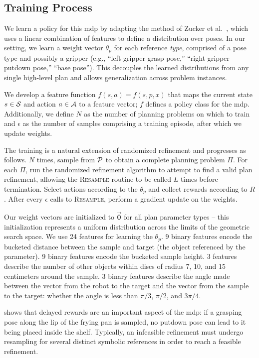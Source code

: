 \subsection{Training Process}
We learn a policy for this {\sc mdp} by adapting the method of Zucker et al.~\cite{workspacebias}, which
uses a linear combination of features to define a distribution over poses. In our setting, we learn a weight
vector $\theta_{p}$ for each reference \emph{type}, comprised of a pose type and possibly a gripper
(e.g., ``left gripper grasp pose,'' ``right gripper putdown pose,'' ``base pose'').
This decouples the learned distributions from any single high-level plan and allows generalization across problem instances.

We develop a feature function $f(s, a) = f(s, p, x)$ that maps the current
state $s \in \mathcal{S}$ and action $a \in \mathcal{A}$ to a
feature vector; $f$ defines a policy class for the {\sc mdp}. Additionally, we define
$N$ as the number of planning problems on which to train and
$\epsilon$ as the number of samples comprising a training episode, after which we update weights.

The training is a natural extension of randomized
refinement and progresses as follows. $N$ times, sample from $\mathcal{P}$ to obtain
a complete planning problem $\Pi$. For each $\Pi$, run the randomized refinement
algorithm to attempt to find a valid plan refinement, allowing the \textsc{Resample}
routine to be called $L$ times before termination. Select actions according to the $\theta_{p}$
and collect rewards according to $R$. After every $\epsilon$ calls to
\textsc{Resample}, perform a gradient update on the weights.

Our weight vectors are initialized to $\vec{\mathbf{0}}$ for all plan parameter types -- this
initialization represents a uniform distribution across the limits of the geometric search space.
We use 24 features for learning the $\theta_{p}$. 9 binary features encode the bucketed distance between the sample
and target (the object referenced by the parameter). 9 binary features encode the bucketed sample height. 3 features
describe the number of other objects within discs of radius 7, 10, and 15 centimeters around the
sample. 3 binary features describe the angle made between the vector from the
robot to the target and the vector from the sample to the target: whether the angle is less than
$\pi/3$, $\pi/2$, and $3\pi/4$.

 shows that delayed rewards are an important
aspect of the {\sc mdp}: if a grasping pose along the lip of the frying pan is sampled, no putdown pose can lead
to it being placed inside the shelf. Typically, an infeasible refinement must undergo
resampling for several distinct symbolic references in order to reach a feasible refinement.

